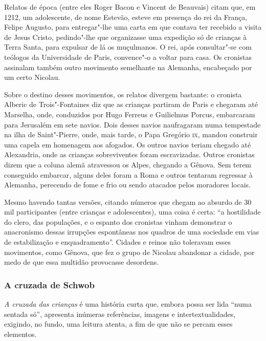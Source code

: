 \documentclass[12pt]{extarticle}
\begin{document}


Relatos de época (entre eles Roger Bacon e Vincent de Beauvais) citam
que, em 1212, um adolescente, de nome Estevão, esteve em presença do rei
da França, Felipe Augusto, para entregar"-lhe uma carta em que contava
ter recebido a visita de Jesus Cristo, pedindo"-lhe que organizasse uma
expedição só de crianças à Terra Santa, para expulsar de lá os
muçulmanos. O rei, após consultar"-se com teólogos da Universidade de
Paris, convence"-o a voltar para casa. Os cronistas assinalam também
outro movimento semelhante na Alemanha, encabeçado por um certo
Nicolau.

Sobre o destino desses movimentos, os relatos divergem bastante: o
cronista Alberic de Trois"-Fontaines diz que as crianças partiram de Paris
e chegaram até Marselha, onde, conduzidos por Hugo Ferreus e Guilielmus
Porcus, embarcaram para Jerusalém em sete navios. Dois desses navios
naufragaram numa tempestade na ilha de Saint"-Pierre, onde, mais tarde, o
Papa Gregório \textsc{ix}, mandou construir uma capela em homenagem aos afogados.
Os outros navios teriam chegado até Alexandria, onde as crianças
sobreviventes foram escravizadas. Outros cronistas dizem que a coluna
alemã atravessou os Alpes, chegando a Gênova. Sem terem conseguido
embarcar, alguns deles foram a Roma e outros tentaram regressar à
Alemanha, perecendo de fome e frio ou sendo atacados pelos moradores
locais.

Mesmo havendo tantas versões, citando números que chegam ao absurdo de
30 mil participantes (entre crianças e adolescentes), uma coisa é certa:
``a hostilidade do clero, das populações, e o espanto dos cronistas
vinham demonstrar o anacronismo dessas irrupções espontâneas nos quadros
de uma sociedade em vias de estabilização e enquadramento''. Cidades e
reinos não toleravam esses movimentos, como Gênova, que fez o grupo de
Nicolau abandonar a cidade, por medo de que essa multidão provocasse
desordens.

\subsubsection{A cruzada de Schwob}

\textit{A cruzada das crianças} é uma história curta que, embora possa ser lida
``numa sentada só'', apresenta inúmeras referências, imagens e
intertextualidades, exigindo, no fundo, uma leitura atenta, a fim de que
não se percam esses elementos.
\end{document}
